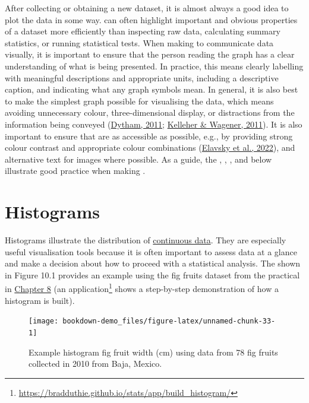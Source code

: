 \documentclass[
  openany]{krantz}
\begin{document}
After collecting or obtaining a new dataset, it is almost always a good idea to plot the data in some way.
 can often highlight important and obvious properties of a dataset more efficiently than inspecting raw data, calculating summary statistics, or running statistical tests.
When making  to communicate data visually, it is important to ensure that the person reading the graph has a clear understanding of what is being presented.
In practice, this means clearly labelling  with meaningful descriptions and appropriate units, including a descriptive caption, and indicating what any graph symbols mean.
In general, it is also best to make the simplest graph possible for visualising the data, which means avoiding unnecessary colour, three-dimensional display, or distractions from the information being conveyed (\protect\hyperlink{ref-Dytham2011}{Dytham, 2011}; \protect\hyperlink{ref-Kelleher2011}{Kelleher \& Wagener, 2011}).
It is also important to ensure that  are as accessible as possible, e.g., by providing strong colour contrast and appropriate colour combinations (\protect\hyperlink{ref-Elavsky2022}{Elavsky et al., 2022}), and alternative text for images where possible.
As a guide, the , , , and  below illustrate good practice when making .

\hypertarget{histograms}{%
\section{Histograms}\label{histograms}}

Histograms illustrate the distribution of \protect\hyperlink{Chapter_5}{continuous data}.
They are especially useful visualisation tools because it is often important to assess data at a glance and make a decision about how to proceed with a statistical analysis.
The  shown in Figure 10.1 provides an example using the fig fruits dataset from the practical in \protect\hyperlink{Chapter_8}{Chapter 8} (an  application\footnote{\url{https://bradduthie.github.io/stats/app/build_histogram/}} shows a step-by-step demonstration of how a histogram is built).

\begin{figure}
\texttt{[image: bookdown-demo\_files/figure-latex/unnamed-chunk-33-1]} \caption{Example histogram fig fruit width (cm) using data from 78 fig fruits collected in 2010 from Baja, Mexico.}\label{fig:unnamed-chunk-33}
\end{figure}
\end{document}

